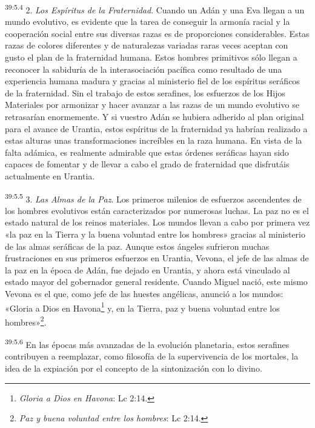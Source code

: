 \par
\textsuperscript{39:5.4} 2. \textit{Los Espíritus de la Fraternidad}. Cuando un Adán y una Eva llegan a un mundo evolutivo, es evidente que la tarea de conseguir la armonía racial y la cooperación social entre sus diversas razas es de proporciones considerables. Estas razas de colores diferentes y de naturalezas variadas raras veces aceptan con gusto el plan de la fraternidad humana. Estos hombres primitivos sólo llegan a reconocer la sabiduría de la interasociación pacífica como resultado de una experiencia humana madura y gracias al ministerio fiel de los espíritus seráficos de la fraternidad. Sin el trabajo de estos serafines, los esfuerzos de los Hijos Materiales por armonizar y hacer avanzar a las razas de un mundo evolutivo se retrasarían enormemente. Y si vuestro Adán se hubiera adherido al plan original para el avance de Urantia, estos espíritus de la fraternidad ya habrían realizado a estas alturas unas transformaciones increíbles en la raza humana. En vista de la falta adámica, es realmente admirable que estas órdenes seráficas hayan sido capaces de fomentar y de llevar a cabo el grado de fraternidad que disfrutáis actualmente en Urantia.

\par
\textsuperscript{39:5.5} 3. \textit{Las Almas de la Paz}. Los primeros milenios de esfuerzos ascendentes de los hombres evolutivos están caracterizados por numerosas luchas. La paz no es el estado natural de los reinos materiales. Los mundos llevan a cabo por primera vez «la paz en la Tierra y la buena voluntad entre los hombres» gracias al ministerio de las almas seráficas de la paz. Aunque estos ángeles sufrieron muchas frustraciones en sus primeros esfuerzos en Urantia, Vevona, el jefe de las almas de la paz en la época de Adán, fue dejado en Urantia, y ahora está vinculado al estado mayor del gobernador general residente. Cuando Miguel nació, este mismo Vevona es el que, como jefe de las huestes angélicas, anunció a los mundos: «Gloria a Dios en Havona\footnote{\textit{Gloria a Dios en Havona}: Lc 2:14.} y, en la Tierra, paz y buena voluntad entre los hombres»\footnote{\textit{Paz y buena voluntad entre los hombres}: Lc 2:14.}.

\par
\textsuperscript{39:5.6} En las épocas más avanzadas de la evolución planetaria, estos serafines contribuyen a reemplazar, como filosofía de la supervivencia de los mortales, la idea de la expiación por el concepto de la sintonización con lo divino.

